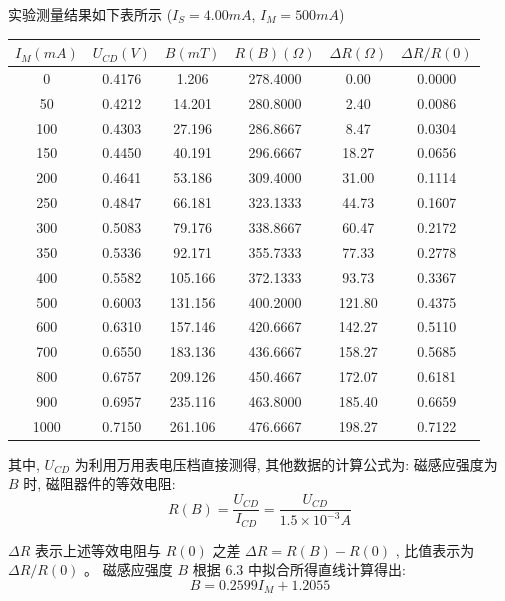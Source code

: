\documentclass[UTF8]{ctexart}
\begin{document}
实验测量结果如下表所示 ($I_S = 4.00mA$, $I_M = 500mA$)

\begin{center}
  \begin{tabular}{c|c|c|c|c|c}
    \hline $I_M(mA)$ & $U_{CD}(V)$ & $B(mT)$ & $R(B)(\Omega) $ & $\Delta R(\Omega)$ &$\Delta R/R(0)$ \\
   \hline
    0     & 0.4176 & 1.206  & 278.4000  & 0.00  & 0.0000 \\
   \hline
    50    & 0.4212 & 14.201  & 280.8000  & 2.40  & 0.0086 \\
   \hline
    100   & 0.4303 & 27.196  & 286.8667  & 8.47  & 0.0304 \\
   \hline
    150   & 0.4450 & 40.191  & 296.6667  & 18.27  & 0.0656 \\
   \hline
    200   & 0.4641 & 53.186  & 309.4000  & 31.00  & 0.1114 \\
   \hline
    250   & 0.4847 & 66.181  & 323.1333  & 44.73  & 0.1607 \\
   \hline
    300   & 0.5083 & 79.176  & 338.8667  & 60.47  & 0.2172 \\
   \hline
    350   & 0.5336 & 92.171  & 355.7333  & 77.33  & 0.2778 \\
   \hline
    400   & 0.5582 & 105.166  & 372.1333  & 93.73  & 0.3367 \\
   \hline
    500   & 0.6003 & 131.156  & 400.2000  & 121.80  & 0.4375 \\
   \hline
    600   & 0.6310 & 157.146  & 420.6667  & 142.27  & 0.5110 \\
   \hline
    700   & 0.6550 & 183.136  & 436.6667  & 158.27  & 0.5685 \\
   \hline
    800   & 0.6757 & 209.126  & 450.4667  & 172.07  & 0.6181 \\
   \hline
    900   & 0.6957 & 235.116  & 463.8000  & 185.40  & 0.6659 \\
   \hline
    1000  & 0.7150 & 261.106  & 476.6667  & 198.27  & 0.7122 \\
    \hline
\end{tabular}
\end{center}

其中, $ U_{C D}$  为利用万用表电压档直接测得, 其他数据的计算公式为:
磁感应强度为 $ B$  时, 磁阻器件的等效电阻:
$$
R(B)=\frac{U_{C D}}{I_{C D}}=\frac{U_{C D}}{1.5 \times 10^{-3} A}
$$

 $\Delta R $ 表示上述等效电阻与 $ R(0)$  之差  $\Delta R=R(B)-R(0)$ , 比值表示为 $ \Delta R / R(0)$  。 磁感应强度 $ B $ 根据  6.3  中拟合所得直线计算得出:
$$
B=0.2599 I_{M}+1.2055
$$
\end{document}
